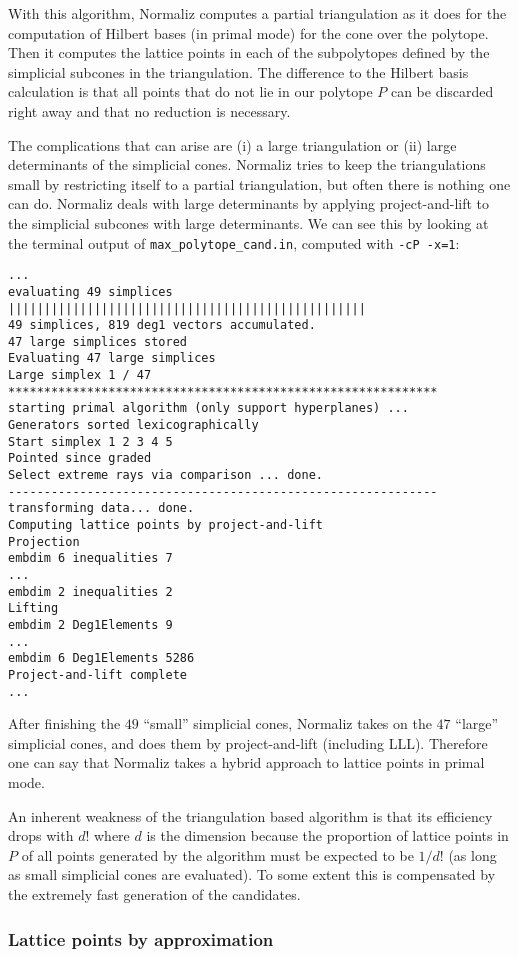 With this algorithm, Normaliz computes a partial triangulation as it does for the computation of Hilbert bases (in primal mode) for the cone over the polytope. Then it computes the lattice points in each of the subpolytopes defined by the simplicial subcones in the triangulation. The difference to the Hilbert basis calculation is that all points that do not lie in our polytope $P$ can be discarded right away and that no reduction is necessary.

The complications that can arise are (i) a large triangulation or (ii) large determinants of the simplicial cones. Normaliz tries to keep the triangulations small by restricting itself to a partial triangulation, but often there is nothing one can do. Normaliz deals with large determinants by applying project-and-lift to the simplicial subcones with large determinants. We can see this by looking at the terminal output of \verb|max_polytope_cand.in|, computed with \verb|-cP -x=1|:
\begin{Verbatim}
...
evaluating 49 simplices
||||||||||||||||||||||||||||||||||||||||||||||||||
49 simplices, 819 deg1 vectors accumulated.
47 large simplices stored
Evaluating 47 large simplices
Large simplex 1 / 47
************************************************************
starting primal algorithm (only support hyperplanes) ...
Generators sorted lexicographically
Start simplex 1 2 3 4 5 
Pointed since graded
Select extreme rays via comparison ... done.
------------------------------------------------------------
transforming data... done.
Computing lattice points by project-and-lift
Projection
embdim 6 inequalities 7
...
embdim 2 inequalities 2
Lifting
embdim 2 Deg1Elements 9
...
embdim 6 Deg1Elements 5286
Project-and-lift complete
...
\end{Verbatim}
After finishing the $49$ ``small'' simplicial cones, Normaliz takes on the $47$ ``large'' simplicial cones, and does them by project-and-lift (including LLL). Therefore one can say that Normaliz takes a hybrid approach to lattice points in primal mode.

An inherent weakness of the triangulation based algorithm is that its efficiency drops with $d!$ where $d$ is the dimension because the proportion of lattice points in $P$ of all points generated by the algorithm must be expected to be $1/d!$ (as long as small simplicial cones are evaluated). To some extent this is compensated by the extremely fast generation of the candidates.

\subsubsection{Lattice points by approximation}\label{approx}

